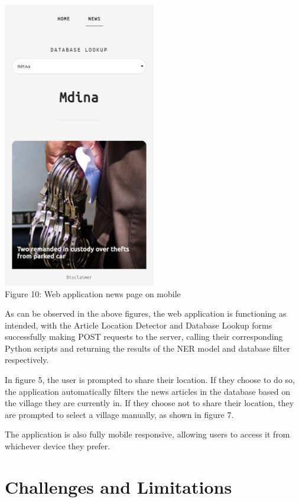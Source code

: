 \documentclass[a4paper, oneside, 11pt]{article}
\begin{document}
\begin{multicols*}{2}
  \begin{center}
    \includegraphics[width=0.5\textwidth]{./figures/mobilenews.png} \\
    Figure 10: Web application news page on mobile
  \end{center}

  As can be observed in the above figures, the web application is functioning as intended, with the Article Location Detector and Database Lookup forms successfully making POST requests to the server, calling their corresponding Python scripts and returning the results of the NER model and database filter respectively.

  In figure 5, the user is prompted to share their location. If they choose to do so, the application automatically filters the news articles in the database based on the village they are currently in. If they choose not to share their location, they are prompted to select a village manually, as shown in figure 7.

  The application is also fully mobile responsive, allowing users to access it from whichever device they prefer.



  \section{Challenges and Limitations}


\end{multicols*}
\end{document}
